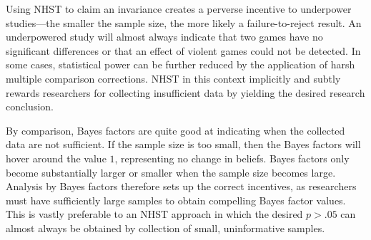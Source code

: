 \documentclass[man]{apa6}
\begin{document}

Using NHST to claim an invariance creates a perverse incentive to underpower studies---the smaller the sample size, the more likely a failure-to-reject result.  An underpowered study will almost always indicate that two games have no significant differences or that an effect of violent games could not be detected. In some cases, statistical power can be further reduced by the application of harsh multiple comparison corrections. NHST in this context implicitly and subtly rewards researchers for collecting insufficient data by yielding the desired research conclusion.

By comparison, Bayes factors are quite good at indicating when the collected data are not sufficient. If the sample size is too small, then the Bayes factors will hover around the value $1$, representing no change in beliefs. Bayes factors only become substantially larger or smaller when the sample size becomes large.  Analysis by Bayes factors therefore sets up the correct incentives, as researchers must have sufficiently large samples to obtain compelling Bayes factor values. This is vastly preferable to an NHST approach in which the desired $p > .05$ can almost always be obtained by collection of small, uninformative samples.
\end{document}
